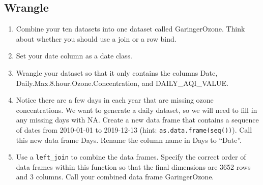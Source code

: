 \documentclass[
]{article}
\begin{document}
\hypertarget{wrangle}{%
\subsection{Wrangle}\label{wrangle}}

\begin{enumerate}
\def\labelenumi{\arabic{enumi}.}
\setcounter{enumi}{1}
\item
  Combine your ten datasets into one dataset called GaringerOzone. Think
  about whether you should use a join or a row bind.
\item
  Set your date column as a date class.
\item
  Wrangle your dataset so that it only contains the columns Date,
  Daily.Max.8.hour.Ozone.Concentration, and DAILY\_AQI\_VALUE.
\item
  Notice there are a few days in each year that are missing ozone
  concentrations. We want to generate a daily dataset, so we will need
  to fill in any missing days with NA. Create a new data frame that
  contains a sequence of dates from 2010-01-01 to 2019-12-13 (hint:
  \texttt{as.data.frame(seq())}). Call this new data frame Days. Rename
  the column name in Days to ``Date''.
\item
  Use a \texttt{left\_join} to combine the data frames. Specify the
  correct order of data frames within this function so that the final
  dimensions are 3652 rows and 3 columns. Call your combined data frame
  GaringerOzone.
\end{enumerate}
\end{document}

